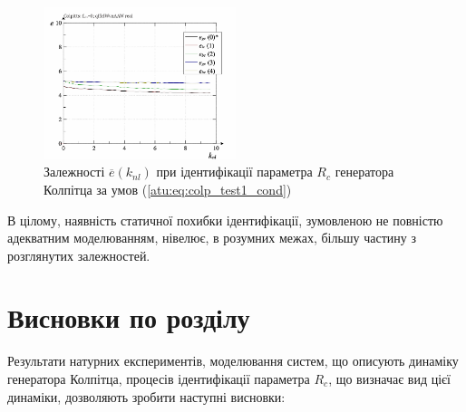 \begin{figure}[htb!]
  \centerline{\includegraphics[width=0.50\textwidth]{p/r/colp_real_id-p_k_nl_d_0.png} }
\caption{Залежності $ \overline{e} (k_{nl}) $ при ідентифікації параметра $ R_c $ генератора Колпітца за умов (\ref{atu:eq:colp_test1_cond})}
  \label{atu:f:colp_real_id_p_k_nl_d_0}
\end{figure}
%
%

В цілому, наявність статичної похибки ідентифікації, зумовленою
не повністю адекватним моделюванням, нівелює, в розумних межах,
більшу частину з розглянутих залежностей.




\section{Висновки по розділу \thechapter} %

Результати натурних експериментів, моделювання систем, що
описують динаміку генератора Колпітца, процесів ідентифікації
параметра
$ R_c $, що визначає вид цієї динаміки, дозволяють зробити наступні
висновки:

